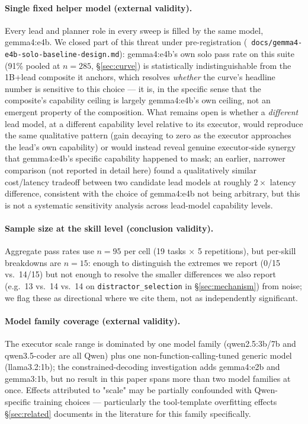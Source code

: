 \documentclass[smallcondensed,natbib]{svjour3}
\begin{document}
\paragraph{Single fixed helper model (external validity).} Every lead and planner role in
every sweep is filled by the same model, gemma4:e4b. We closed part of
this threat under pre-registration (\texttt{
docs/gemma4-e4b-solo-baseline-design.md}): gemma4:e4b's own solo pass
rate on this suite (91\% pooled at $n{=}285$, \S\ref{sec:curve}) is
statistically indistinguishable from the 1B+lead composite it anchors, which
resolves \emph{whether} the curve's headline number is sensitive to
this choice --- it is, in the specific sense that the composite's
capability ceiling is largely gemma4:e4b's own ceiling, not an emergent
property of the composition. What remains open is whether a
\emph{different} lead model, at a different capability level relative
to its executor, would reproduce the same qualitative pattern (gain
decaying to zero as the executor approaches the lead's own capability)
or would instead reveal genuine executor-side synergy that gemma4:e4b's
specific capability happened to mask; an earlier, narrower comparison
(not reported in detail here) found a qualitatively similar
cost/latency tradeoff between two candidate lead models at roughly
$2\times$ latency difference, consistent with the choice of gemma4:e4b
not being arbitrary, but this is not a systematic sensitivity analysis
across lead-model capability levels.

\paragraph{Sample size at the skill level (conclusion validity).} Aggregate pass rates use
$n{=}95$ per cell (19 tasks $\times$ 5 repetitions), but per-skill
breakdowns are $n{=}15$: enough to distinguish the extremes we report
(0/15 vs.\ 14/15) but not enough to resolve the smaller differences we
also report (e.g.\ 13 vs.\ 14 vs.\ 14 on \texttt{distractor\_selection}
in \S\ref{sec:mechanism}) from noise; we flag these as directional
where we cite them, not as independently significant.

\paragraph{Model family coverage (external validity).} The executor scale range is
dominated by one model family (qwen2.5:3b/7b and qwen3.5-coder are all
Qwen) plus one non-function-calling-tuned generic model
(llama3.2:1b); the constrained-decoding investigation adds gemma4:e2b
and gemma3:1b, but no result in this paper spans more than two model
families at once. Effects attributed to "scale" may be partially
confounded with Qwen-specific training choices --- particularly the
tool-template overfitting effects \S\ref{sec:related} documents in the
literature for this family specifically.
\end{document}
